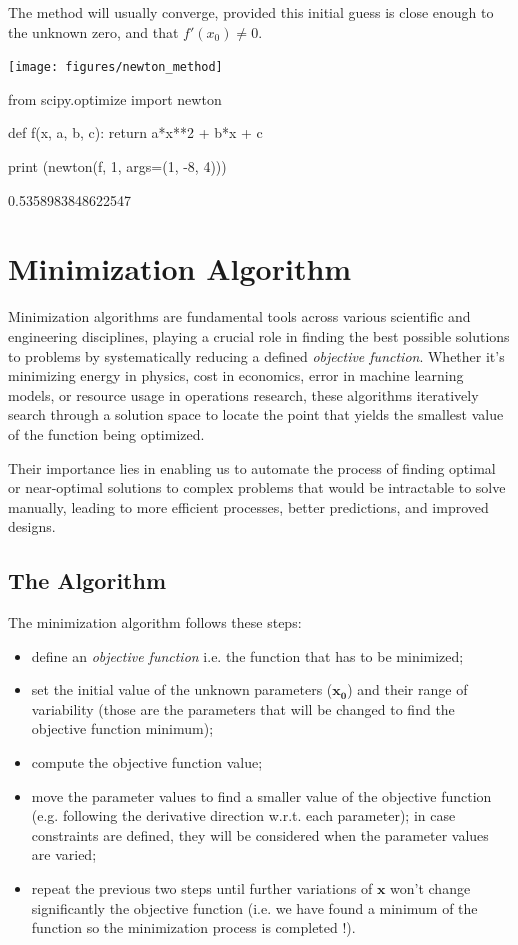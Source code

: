 The method will usually converge, provided this initial guess is close enough to the unknown zero, and that $f'(x_0) \neq 0$.
\begin{center}
	\texttt{[image: figures/newton\_method]}
\end{center}

\begin{ipythonnon}
from scipy.optimize import newton 

def f(x, a, b, c):
    return a*x**2 + b*x + c 
  
print (newton(f, 1, args=(1, -8, 4)))
\end{ipythonnon}
\begin{ioutput}
0.5358983848622547
\end{ioutput}

\section{Minimization  Algorithm}
\label{minimization-algorithm}

Minimization algorithms are fundamental tools across various scientific and engineering disciplines, playing a crucial role in finding the best possible 
solutions to problems by systematically reducing a defined \emph{objective function}. Whether it's minimizing energy in physics, cost in economics, 
error in machine learning models, or resource usage in operations research, these algorithms iteratively search through a solution space to locate the point 
that yields the smallest value of the function being optimized. 

Their importance lies in enabling us to automate the process of finding optimal or near-optimal solutions to complex problems that would be intractable to 
solve manually, leading to more efficient processes, better predictions, and improved designs.

\subsection{The Algorithm}
The minimization algorithm follows these steps:

\begin{itemize}
\tightlist
\item
  define an \emph{objective function} i.e. the function that has to be minimized;
\item
  set the initial value of the unknown parameters ($\mathbf{x_0}$) and their range of variability (those are the parameters that will be changed to find 
  the objective function minimum);
\item
  compute the objective function value;
\item
  move the parameter values to find a smaller value of the objective function (e.g. following the derivative direction w.r.t. each parameter); in 
  case constraints are defined, they will be considered when the parameter values are varied;
\item
  repeat the previous two steps until further variations of $\mathbf{x}$ won't change significantly the objective
  function (i.e. we have found a minimum of the function so the minimization process is completed !).
\end{itemize}

